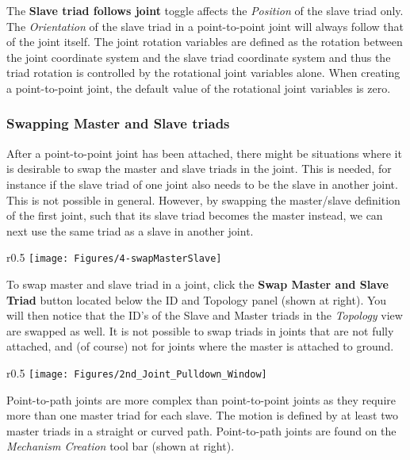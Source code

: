 The \textbf{Slave triad follows joint} toggle affects the
{\sl Position} of the slave triad only. The {\sl Orientation} of the
slave triad in a point-to-point joint will always follow that of the
joint itself. The joint rotation variables are defined as the rotation
between the joint coordinate system and the slave triad coordinate
system and thus the triad rotation is controlled by the rotational joint
variables alone. When creating a point-to-point joint, the default value
of the rotational joint variables is zero.


\subsubsection{Swapping Master and Slave triads}

After a point-to-point joint has been attached, there might be situations where
it is desirable to swap the master and slave triads in the joint.
This is needed, for instance if the slave triad of one joint
also needs to be the slave in another joint. This is not possible in general.
However, by swapping the master/slave definition of the first joint,
such that its slave triad becomes the master instead,
we can next use the same triad as a slave in another joint.

\clearpage
\begin{wrapfigure}{r}{0.5\textwidth}
  \center
  \texttt{[image: Figures/4-swapMasterSlave]}
\end{wrapfigure}

To swap master and slave triad in a joint, click the \textbf{Swap Master and
Slave Triad} button located below the ID and Topology panel (shown at right).
You will then notice that the ID's of the Slave and Master triads in
the {\sl Topology} view are swapped as well.
It is not possible to swap triads in joints that are not fully attached,
and (of course) not for joints where the master is attached to ground.



\begin{wrapfigure}[7]{r}{0.5\textwidth}
  \vspace{-4mm}
  \center
  \texttt{[image: Figures/2nd\_Joint\_Pulldown\_Window]}
\end{wrapfigure}

Point-to-path joints are more complex than point-to-point joints
as they require more than one master triad for each slave.
The motion is defined by at least two master triads in a
straight or curved path. Point-to-path joints are found on the
{\sl Mechanism Creation} tool bar (shown at right).

